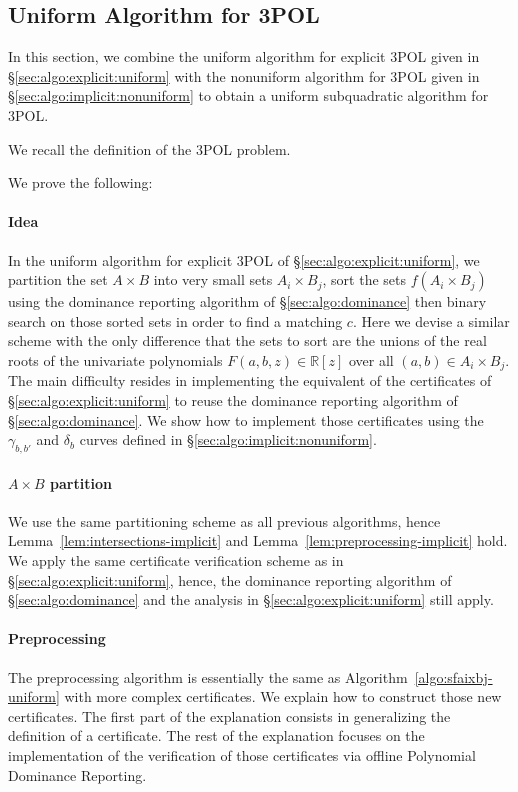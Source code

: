 \subsection{Uniform Algorithm for 3POL}%
\label{sec:algo:implicit:uniform}

In this section, we combine the uniform algorithm for explicit 3POL given in
\S\ref{sec:algo:explicit:uniform} with the nonuniform algorithm for
3POL given in \S\ref{sec:algo:implicit:nonuniform} to obtain a uniform
subquadratic algorithm for 3POL\@.

We recall the definition of the 3POL problem.
\ProblemPOLImplicit*

We prove the following:
\restate{\TheoremPOLUniformImplicit*}

\paragraph{Idea}
In the uniform algorithm for explicit 3POL of
\S\ref{sec:algo:explicit:uniform}, we partition the set $A \times B$
into very small sets $A_i \times B_j$, sort the sets $f(A_i \times B_j)$ using
the dominance reporting algorithm of \S\ref{sec:algo:dominance} then
binary search on those sorted sets in order to find a matching $c$.
%
Here we devise a similar scheme with the only difference that the sets to sort
are the unions of the real roots of the univariate polynomials
$F(a,b,z)\in\mathbb{R}[z]$ over all $(a,b) \in A_i \times B_j$.
%
The main difficulty resides in implementing the
equivalent of the certificates of \S\ref{sec:algo:explicit:uniform} to reuse
the dominance reporting algorithm of \S\ref{sec:algo:dominance}. We show how to
implement those certificates using the $\gamma_{b,b'}$ and $\delta_b$ curves
defined in \S\ref{sec:algo:implicit:nonuniform}.

\paragraph{$A \times B$ partition}
We use the same partitioning scheme as all previous
algorithms, hence Lemma~\ref{lem:intersections-implicit} and
Lemma~\ref{lem:preprocessing-implicit} hold. We apply the same certificate verification
scheme as in \S\ref{sec:algo:explicit:uniform}, hence, the dominance
reporting algorithm of \S\ref{sec:algo:dominance} and the analysis
in \S\ref{sec:algo:explicit:uniform} still apply.

\paragraph{Preprocessing}
The preprocessing algorithm is essentially the same as
Algorithm~\ref{algo:sfaixbj-uniform} with more complex certificates. We explain how to
construct those new certificates. The first part of the explanation consists in
generalizing the definition of a certificate. The rest of the
explanation focuses on the implementation of the verification of those
certificates via offline Polynomial Dominance Reporting.

